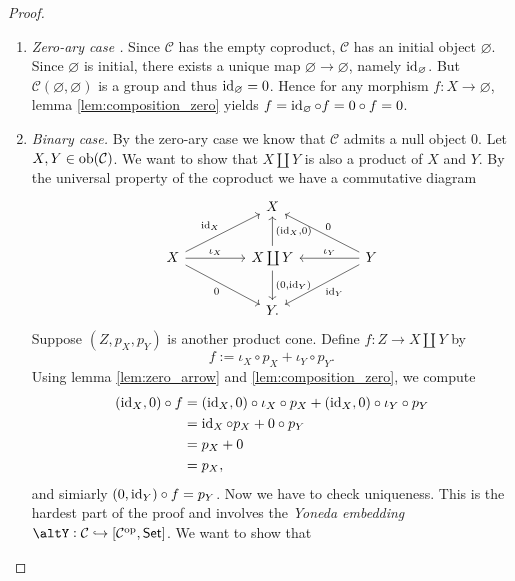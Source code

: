 \begin{proof}
	\begin{enumerate}[label = \textit{Step \arabic*:},wide = 0pt] 
		\item \textit{Zero-ary case \textup{\cite[194]{maclane:categories:1978}}.} Since $\mathcal{C}$ has the empty coproduct, $\mathcal{C}$ has an initial object $\varnothing$. Since $\varnothing$ is initial, there exists a unique map $\varnothing \to \varnothing$, namely $\operatorname{id}_\varnothing$. But $\mathcal{C}(\varnothing,\varnothing)$ is a group and thus $\operatorname{id}_\varnothing = 0$. Hence for any morphism $f : X \to \varnothing$, lemma \ref{lem:composition_zero} yields $f = \operatorname{id}_\varnothing \circ f = 0 \circ f = 0$.
		\item \textit{Binary case.} By the zero-ary case we know that $\mathcal{C}$ admits a null object $0$. Let $X,Y \in \operatorname{ob}(\mathcal{C})$. We want to show that $X \coprod Y$ is also a product of $X$ and $Y$. By the universal property of the coproduct we have a commutative diagram
			\begin{equation*}
				\begin{tikzcd}[column sep=10ex,row sep=5ex]
					& X\\
					X \arrow[ur,"\id_X"]\arrow[dr,"0"']\arrow[r,"\iota_X"] & X \coprod Y \arrow[u,"{(\id_X,0)}"']\arrow[d,"{(0,\id_Y)}"] & Y \arrow[ul,"0"']\arrow[dl,"\id_Y"]\arrow[l,"\iota_Y"']\\
					& Y.
				\end{tikzcd}
			\end{equation*}
			Suppose $(Z,p_X,p_Y)$ is another product cone. Define $f : Z \to X \coprod Y$ by
			\begin{equation*}
				f := \iota_X \circ p_X + \iota_Y \circ p_Y.
			\end{equation*}
			Using lemma \ref{lem:zero_arrow} and \ref{lem:composition_zero}, we compute
			\begin{align*}
				(\operatorname{id}_X,0) \circ f &= (\operatorname{id}_X,0) \circ \iota_X \circ p_X + (\operatorname{id}_X,0) \circ \iota_Y \circ p_Y\\
				&= \operatorname{id}_X \circ p_X + 0 \circ p_Y\\
				&= p_X + 0\\
				&= p_X,
			\end{align*}
			\noindent and simiarly $(0,\operatorname{id}_Y) \circ f = p_Y$. Now we have to check uniqueness. This is the hardest part of the proof and involves the \emph{Yoneda embedding} $\mathcal{\altY} : \mathcal{C} \hookrightarrow \sbr[0]{\mathcal{C}^{\mathrm{op}},\mathsf{Set}}$. We want to show that
			\begin{equation*}

\end{equation*}
\end{enumerate}
\end{proof}
